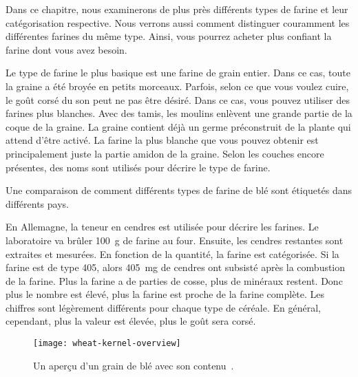 \begin{quoting}
Dans ce chapitre, nous examinerons de plus près différents types de farine
et leur catégorisation respective. Nous verrons aussi comment distinguer couramment
les différentes farines du même type. Ainsi, vous pourrez acheter plus confiant
la farine dont vous avez besoin.
\end{quoting}

Le type de farine le plus basique est une farine de grain entier. Dans ce cas, toute la graine a
été broyée en petits morceaux. Parfois, selon ce que vous voulez cuire,
le goût corsé du son peut ne pas être désiré. Dans ce cas, vous pouvez utiliser
des farines plus blanches. Avec des tamis, les moulins enlèvent une grande partie de la coque de la graine.
La graine contient déjà un germe préconstruit de la plante qui attend d'être
activé. La farine la plus blanche que vous pouvez obtenir est principalement juste la partie amidon de la graine.
Selon les couches encore présentes, des noms sont utilisés pour décrire le
type de farine.

\begin{table}[!htb]
    \begin{center}
        
        \caption[Étiquetage de la farine de blé]{Une comparaison de comment différents types
            de farine de blé sont étiquetés dans différents pays.}%
        \label{tab:flour-types-comparison}
    \end{center}
\end{table}

En Allemagne, la teneur en cendres est utilisée pour décrire les farines. Le laboratoire va brûler
\qty{100}{\gram} de farine au four. Ensuite, les cendres restantes sont extraites
et mesurées. En fonction de la quantité, la farine est catégorisée. Si la farine
est de type 405, alors \qty{405}{\mg} de cendres ont subsisté après la combustion de la
farine. Plus la farine a de parties de cosse, plus de minéraux restent. Donc plus
le nombre est élevé, plus la farine est proche de la farine complète. Les chiffres sont
légèrement différents pour chaque type de céréale. En général, cependant, plus la
valeur est élevée, plus le goût sera corsé.

\begin{figure}[htb!]
  \texttt{[image: wheat-kernel-overview]}
  \caption[Contenu d'un grain de blé]{Un aperçu d'un grain de blé avec
      son contenu~\cite{wheat+kernel}.}%
  \label{fig:wheat-kernel-overview}
\end{figure}

